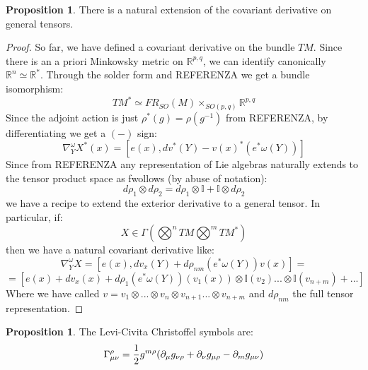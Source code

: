 \documentclass[12pt,a4paper]{report}
\theoremstyle{definition}
\theoremstyle{Theorem}
\newtheorem{Prop}[Def]{Proposition}
\theoremstyle{definition}
\theoremstyle{definition}
\begin{document}
		\begin{Prop}
			There is a natural extension of the covariant derivative on general tensors.
		\end{Prop}
		\begin{proof}
			So far, we have defined a covariant derivative on the bundle $TM$. Since there is an a priori Minkowsky metric on $\mathbb{R}^{p,q}$, we can identify canonically $\mathbb{R}^n\simeq \mathbb{R}^*$. Through the solder form and REFERENZA we get a bundle isomorphism:
			$$TM^*\simeq FR_{SO}(M)\times_{SO(p,q)} \mathbb{R}^{p,q}$$
			Since the adjoint action is just $\rho^*(g)=\rho(g^{-1})$ from REFERENZA, by differentiating we get a $(-)$ sign:
			$$\nabla_Y^\omega X^*(x)=[e(x),dv^*(Y)-v(x)^*(e^*\omega(Y))]$$
			Since from REFERENZA any representation of Lie algebras naturally extends to the tensor product space as fwollows (by abuse of notation):
			$$d\rho_1\otimes d\rho_2=d\rho_1\otimes \mathbb{I}+\mathbb{I}\otimes d\rho_2$$
			we have a recipe to extend the exterior derivative to a general tensor. In particular, if:
			$$X\in\Gamma(\bigotimes^n TM\bigotimes^m TM^*)$$
			then we have a natural covariant derivative like:
			$$\nabla_Y^\omega X=[e(x),dv_x(Y)+d\rho_{nm}(e^*\omega(Y))v(x)]=$$$$=[e(x)+dv_x(x)+d\rho_1(e^*\omega(Y))(v_1(x))\otimes\mathbb{I}(v_2)...\otimes\mathbb{I}(v_{n+m})+...]$$
			Where we have called $v=v_1\otimes...\otimes v_n\otimes v_{n+1}...\otimes v_{n+m}$ and $d\rho_{nm}$ the full tensor representation.
		\end{proof}
		\begin{Prop}
			The Levi-Civita Christoffel symbols are:
			$$\Gamma^\rho_{\mu\nu}={1\over 2}g^{m\rho}(\partial_\mu g_{\nu\rho}+\partial_\nu g_{\mu\rho}-\partial_m g_{\mu\nu})$$
		\end{Prop}
\end{document}
